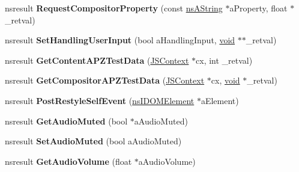 \begin{DoxyCompactItemize}
\item 
\mbox{\label{interfacens_i_d_o_m_window_utils_a3b65e427c0a01a858c35e09be286c511}} 
nsresult {\bfseries Request\+Compositor\+Property} (const \hyperlink{structns_string_container}{ns\+A\+String} $\ast$a\+Property, float $\ast$\+\_\+retval)
\item 
\mbox{\label{interfacens_i_d_o_m_window_utils_a8eedfc902c2cf46a7d50b0cd7756ba7a}} 
nsresult {\bfseries Set\+Handling\+User\+Input} (bool a\+Handling\+Input, \hyperlink{interfacevoid}{void} $\ast$$\ast$\+\_\+retval)
\item 
\mbox{\label{interfacens_i_d_o_m_window_utils_a6e3d164aa367d9aabaf55775115f3180}} 
nsresult {\bfseries Get\+Content\+A\+P\+Z\+Test\+Data} (\hyperlink{interfacevoid}{J\+S\+Context} $\ast$cx, int \+\_\+retval)
\item 
\mbox{\label{interfacens_i_d_o_m_window_utils_a559c108f97de448a990e04021ae450cf}} 
nsresult {\bfseries Get\+Compositor\+A\+P\+Z\+Test\+Data} (\hyperlink{interfacevoid}{J\+S\+Context} $\ast$cx, \hyperlink{interfacevoid}{void} $\ast$\+\_\+retval)
\item 
\mbox{\label{interfacens_i_d_o_m_window_utils_a89e412931a479bd3381a5750f1ce832f}} 
nsresult {\bfseries Post\+Restyle\+Self\+Event} (\hyperlink{interfacens_i_d_o_m_element}{ns\+I\+D\+O\+M\+Element} $\ast$a\+Element)
\item 
\mbox{\label{interfacens_i_d_o_m_window_utils_ade1e19286fdad44563a42f7cfd4ac921}} 
nsresult {\bfseries Get\+Audio\+Muted} (bool $\ast$a\+Audio\+Muted)
\item 
\mbox{\label{interfacens_i_d_o_m_window_utils_ae586722e3d99db157cb7f9e7d0e61c36}} 
nsresult {\bfseries Set\+Audio\+Muted} (bool a\+Audio\+Muted)
\item 
\mbox{\label{interfacens_i_d_o_m_window_utils_a077d5d220eb0edf831dfb8c2d161059d}} 
nsresult {\bfseries Get\+Audio\+Volume} (float $\ast$a\+Audio\+Volume)
\item 
$$
\end{DoxyCompactItemize}
